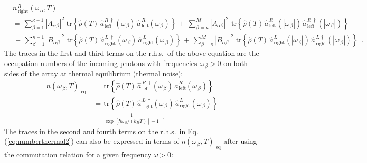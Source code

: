 \begin{equation} \label{eq:numberthermal2} 
\begin{split}
& n_{\,\text{right}}^{\,R}(\omega_{\,\alpha}, T)  \\[3mm]
& = \, \sum\limits_{\beta=1}^{\kappa-1} \left|A_{\alpha \beta}\right|^2 \, \,
\text{tr} \left\{ \hat{\rho}(T) \,
\hat{a}_{\,\text{left}}^{\,R\,\dagger}(\omega_{\,\beta}) \, 
\hat{a}_{\,\text{left}}^{\,R}(\omega_{\,\beta})  
\right\} 
\, + \,
\sum\limits_{\beta=\kappa}^{M} \left|A_{\alpha \beta}\right|^2 \, \,
\text{tr} \left\{ \hat{\rho}(T) \,
\hat{a}_{\,\text{left}}^{\,R}(|\omega_{\,\beta}|) \, 
\hat{a}_{\,\text{left}}^{\,R\,\dagger}(|\omega_{\,\beta}|)  
\right\} \\[3mm]
& \, + \, \sum\limits_{\beta=1}^{\kappa-1} \left|B_{\alpha \beta}\right|^2 \, \,
\text{tr} \left\{ \hat{\rho}(T) \,
\hat{a}_{\,\text{right}}^{\,L\,\dagger}(\omega_{\,\beta}) \, 
\hat{a}_{\,\text{right}}^{\,L}(\omega_{\,\beta})  
\right\} 
\, + \,
\sum\limits_{\beta=\kappa}^{M} \left|B_{\alpha \beta}\right|^2 \, \,
\text{tr} \left\{ \hat{\rho}(T) \,
\hat{a}_{\,\text{right}}^{\,L}(|\omega_{\,\beta}|) \, 
\hat{a}_{\,\text{right}}^{\,L\,\dagger}(|\omega_{\,\beta}|)  
\right\}
\, \, \, .
\end{split}
\end{equation}
%
The traces in the first and third terms on the r.h.s.~of the above equation
are the occupation numbers of the incoming photons with frequencies $\omega_{\,\beta}>0$
on both sides of the array at thermal equilibrium (thermal noise):
%
\begin{equation} \label{eq:ton}
\begin{split}
\left. n(\omega_{\,\beta}, T) \right|_{\text{eq}} \, & = \, 
        \text{tr} \left\{ \hat{\rho}(T) \,
\hat{a}_{\,\text{left}}^{\,R\,\dagger}(\omega_{\,\beta}) \, 
\hat{a}_{\,\text{left}}^{\,R}(\omega_{\,\beta})  \right\} \\[4mm]
& = \, \text{tr} \left\{ \hat{\rho}(T) \,
\hat{a}_{\,\text{right}}^{\,L\,\dagger}(\omega_{\,\beta}) \, 
\hat{a}_{\,\text{right}}^{\,L}(\omega_{\,\beta})  \right\} \\[3mm]
& = \, \displaystyle{\frac{1}{\exp\left[ \hbar \omega_{\,\beta} / (k_B T) \right] - 1}} \, \, \, .
\end{split}
\end{equation} 
%
The traces in the second and fourth terms on the r.h.s.~in Eq.\,(\ref{eq:numberthermal2})
can also be expressed in terms of $\left. n(\omega_{\,\beta}, T) \right|_{\text{eq}}$
after using the commutation relation for a given frequency $\omega > 0$:
